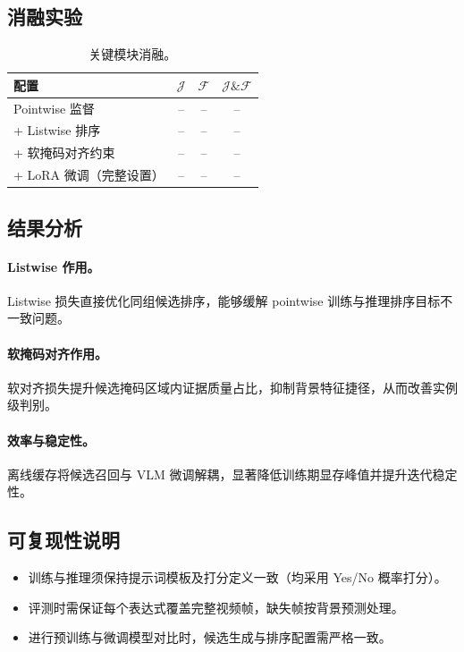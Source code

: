 \subsection{消融实验}
\begin{table}[t]
\centering
\caption{关键模块消融。}
\begin{tabular}{lccc}
\hline
配置 & $\mathcal{J}$ & $\mathcal{F}$ & $\mathcal{J}\&\mathcal{F}$ \\
\hline
Pointwise 监督 & -- & -- & -- \\
+ Listwise 排序 & -- & -- & -- \\
+ 软掩码对齐约束 & -- & -- & -- \\
+ LoRA 微调（完整设置） & -- & -- & -- \\
\hline
\end{tabular}
\label{tab:ablation_cn}
\end{table}

\subsection{结果分析}
\paragraph{Listwise 作用。}
Listwise 损失直接优化同组候选排序，能够缓解 pointwise 训练与推理排序目标不一致问题。

\paragraph{软掩码对齐作用。}
软对齐损失提升候选掩码区域内证据质量占比，抑制背景特征捷径，从而改善实例级判别。

\paragraph{效率与稳定性。}
离线缓存将候选召回与 VLM 微调解耦，显著降低训练期显存峰值并提升迭代稳定性。

\subsection{可复现性说明}
\begin{itemize}
\item 训练与推理须保持提示词模板及打分定义一致（均采用 Yes/No 概率打分）。
\item 评测时需保证每个表达式覆盖完整视频帧，缺失帧按背景预测处理。
\item 进行预训练与微调模型对比时，候选生成与排序配置需严格一致。
\end{itemize}
